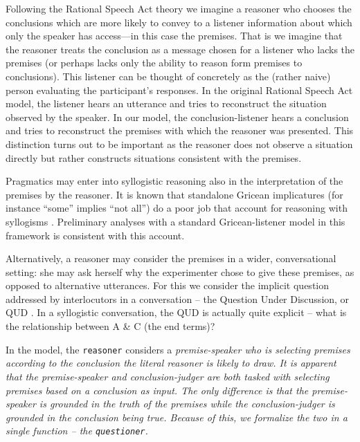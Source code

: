 \documentclass[10pt,letterpaper]{article}
\begin{document}
Following the Rational Speech Act theory \cite{Goodman2013,Frank2012a} we imagine a reasoner who chooses the conclusions which are more likely to convey to a listener information about which only the speaker has access---in this case the premises. That is we imagine that the reasoner treats the conclusion as a message chosen for a listener who lacks the premises (or perhaps lacks only the ability to reason form premises to conclusions).
This listener can be thought of concretely as the (rather naive) person evaluating the participant's responses. In the original Rational Speech Act model, the listener hears an utterance and tries to reconstruct the situation observed by the speaker. In our model, the conclusion-listener hears a conclusion and tries to reconstruct the premises with which the reasoner was presented. This distinction turns out to be important as the reasoner does not observe a situation directly but rather constructs situations consistent with the premises. 

Pragmatics may enter into syllogistic reasoning also in the interpretation of the premises by the reasoner. It is known that standalone Gricean implicatures (for instance ``some'' implies ``not all'') do a poor job that account for reasoning with syllogisms \cite{Roberts2001}. Preliminary analyses with a standard Gricean-listener model in this framework is consistent with this account. 

Alternatively, a reasoner may consider the premises in a wider, conversational setting: she may ask herself why the experimenter chose to give these premises, as opposed to alternative utterances. For this we consider the implicit question addressed by interlocutors in a conversation -- the Question Under Discussion, or QUD \cite{Roberts2004QUD}. In a syllogistic conversation, the QUD is actually quite explicit -- what is the relationship between A \& C (the end terms)?

In the model, the \lstinline{reasoner} considers a \em{premise-speaker} who is selecting premises according to the conclusion the literal \em{reasoner} is likely to draw. It is apparent that the \em{premise-speaker} and \em{conclusion-judger} are both tasked with selecting premises based on a conclusion as input. The only difference is that the \em{premise-speaker} is grounded in the truth of the premises while the \em{conclusion-judger} is grounded in the conclusion being true. Because of this, we formalize the two in a single function -- the \lstinline{questioner}.
\end{document}
